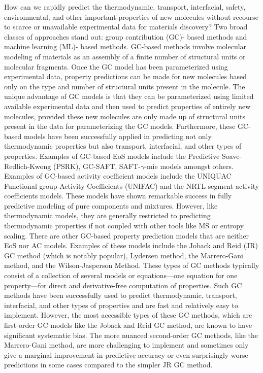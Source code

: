 \documentclass[journal=jacsat,manuscript=article]{achemso}
\begin{document}
How can we rapidly predict the thermodynamic, transport, interfacial, safety, environmental, and other important properties of new molecules without recourse to scarce or unavailable experimental data for materials discovery? Two broad classes of approaches stand out: group contribution (GC)- based methods and machine learning (ML)- based methods. 
GC-based methods involve molecular modeling of materials as an assembly of a finite number of structural units or molecular fragments. 
Once the GC model has been parameterized using experimental data, property predictions can be made for new molecules based only on the type and number of structural units present in the molecule. 
The unique advantage of GC models is that they can be parameterized using limited available experimental data and then used to predict properties of entirely new molecules, provided these new molecules are only made up of structural units present in the data for parameterizing the GC models. 
Furthermore, these GC-based models have been successfully applied in predicting not only thermodynamic properties but also transport, interfacial, and other types of properties. Examples of GC-based EoS models include the Predictive Soave-Redlich-Kwong (PSRK),  GC-SAFT, SAFT-$\gamma$-mie models amongst others. Examples of GC-based activity coefficient models include the UNIQUAC Functional-group Activity Coefficients (UNIFAC) and the NRTL-segment activity coefficients models. 
These models have shown remarkable success in fully predictive modeling of pure components and mixtures. However, like thermodynamic models, they are generally restricted to predicting thermodynamic properties if not coupled with other tools like MS or entropy scaling.
There are other GC-based property prediction models that are neither EoS nor AC models. Examples of these models include the Joback and Reid (JR) GC method (which is notably popular), Lydersen method, the Marrero-Gani method, and the Wilson-Jasperson Method. These types of GC methods typically consist of a collection of several models or equations—one equation for one property—for direct and derivative-free computation of properties. 
Such GC methods have been successfully used to predict thermodynamic, transport, interfacial, and other types of properties and are fast and relatively easy to implement. 
However, the most accessible types of these GC methods, which are first-order GC models like the Joback and Reid GC method, are known to have significant systematic bias. 
The more nuanced second-order GC methods, like the Marrero-Gani method, are more challenging to implement and sometimes only give a marginal improvement in predictive accuracy or even surprisingly worse predictions in some cases compared to the simpler JR GC method. 
\end{document}
